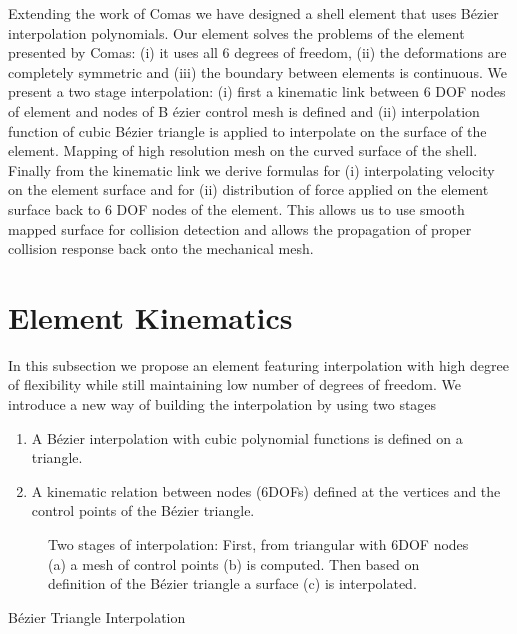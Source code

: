 \documentclass{egpubl}
\newcommand{\FigureWI}[3]{%
\begin{figure*}[htb]
  \centering
  
  \caption{\label{fig-#1}#2}
\end{figure*}}
\begin{document}
Extending the work of Comas \cite{Comas2010c} we have designed a shell element that uses B\'ezier interpolation polynomials.
Our element solves the problems of the element presented by Comas:
(i) it uses all 6 degrees of freedom,
(ii) the deformations are completely symmetric and
(iii) the boundary between elements is continuous.
We present a two stage interpolation:
(i) first a kinematic link between 6 DOF nodes of element and nodes of B \'ezier control mesh is defined and
(ii) interpolation function of cubic B\'ezier triangle is applied to interpolate on the surface of the element.
Mapping of high resolution mesh on the curved surface of the shell.
Finally from the kinematic link we derive formulas for
(i) interpolating velocity on the element surface and for
(ii) distribution of force applied on the element surface back to 6 DOF nodes of the element.
This allows us to use smooth mapped surface for collision detection and allows the propagation of proper collision response back onto the mechanical mesh.



\section{Element Kinematics}\label{sec-kinematics} %

In this subsection we propose an element featuring interpolation with high degree of flexibility while still maintaining low number of degrees of freedom.
We introduce a new way of building the interpolation by using two stages 

\begin{enumerate}
    \item A B\'ezier interpolation with cubic polynomial functions is defined on a triangle.
    \item A kinematic relation between nodes (6DOFs) defined at the vertices and the control points of the B\'ezier triangle.
\end{enumerate}

\FigureWI{stages}
{Two stages of interpolation: First, from triangular with 6DOF nodes (a) a mesh of control points (b) is computed.
Then based on definition of the B\'ezier triangle a surface (c) is interpolated.}

\subsection{B\'ezier Triangle Interpolation} %
\end{document}
